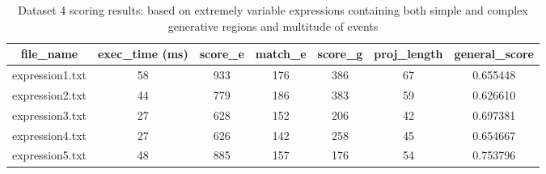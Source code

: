 \documentclass[12pt,a4paper]{article}
\begin{document}
\begin{table}[H]
	\begin{center}
		\caption{Dataset 4 scoring results: based on extremely variable expressions containing both simple and complex generative regions and multitude of events}
		\label{tab:dataset4}
		\begin{tabular}{|c|c|c|c|c|c|c|}
			\hline
			\textbf{file\_name} & \textbf{exec\_time} (ms) & \textbf{score\_e} & \textbf{match\_e} & \textbf{score\_g} & \textbf{proj\_length} & \textbf{general\_score} \\
			\hline\hline
			expression1.txt & 58 & 933 & 176 & 386 & 67 & 0.655448 \\
			\hline
			expression2.txt & 44 & 779 & 186 & 383 & 59 & 0.626610 \\
			\hline
			expression3.txt & 27 & 628 & 152 & 206 & 42 & 0.697381 \\
			\hline
			expression4.txt & 27 & 626 & 142 & 258 & 45 & 0.654667 \\
			\hline
			expression5.txt & 48 & 885 & 157 & 176 & 54 & 0.753796 \\
			\hline
		\end{tabular}
	\end{center}
\end{table}


\pagebreak
\end{document}
